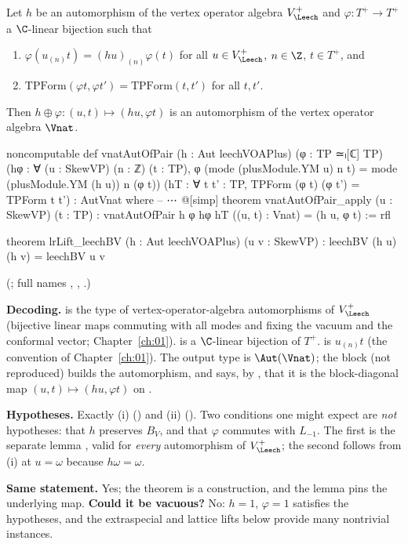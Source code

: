 \begin{theorem}\label{ch22:thm:natural}
Let $h$ be an automorphism of the vertex operator algebra $V_\Leech^+$ and $\varphi:T^+\to T^+$ a $\C$-linear
bijection such that
\begin{enumerate}[label=(\roman*)]
\item $\varphi(u_{(n)}t)=(hu)_{(n)}\varphi(t)$ for all $u\in V_\Leech^+$, $n\in\Z$, $t\in T^+$, and
\item $\mathrm{TPForm}(\varphi t,\varphi t')=\mathrm{TPForm}(t,t')$ for all $t,t'$.
\end{enumerate}
Then $h\oplus\varphi:(u,t)\mapsto(hu,\varphi t)$ is an automorphism of the vertex operator algebra $\Vnat$.
\end{theorem}
\begin{leancode}
noncomputable def vnatAutOfPair (h : Aut leechVOAPlus) (φ : TP ≃ₗ[ℂ] TP)
    (hφ : ∀ (u : SkewVP) (n : ℤ) (t : TP),
      φ (mode (plusModule.YM u) n t) = mode (plusModule.YM (h u)) n (φ t))
    (hT : ∀ t t' : TP, TPForm (φ t) (φ t') = TPForm t t') : AutVnat where
-- ⋯
@[simp] theorem vnatAutOfPair_apply (u : SkewVP) (t : TP) :
    vnatAutOfPair h φ hφ hT ((u, t) : Vnat) = (h u, φ t) := rfl
\end{leancode}
\begin{leancode}
theorem lrLift_leechBV (h : Aut leechVOAPlus) (u v : SkewVP) :
    leechBV (h u) (h v) = leechBV u v
\end{leancode}
(; full names ,
, .)
\begin{dictionary}
\textbf{Decoding.}   is the type of vertex-operator-algebra automorphisms of $V_\Leech^+$
(bijective linear maps commuting with all modes and fixing the vacuum and the conformal vector; Chapter~\ref{ch:01}).
 is a $\C$-linear bijection of $T^+$.   is $u_{(n)}t$ (the
convention  of Chapter~\ref{ch:01}).  The output type  is $\Aut(\Vnat)$; the
 block (not reproduced) builds the automorphism, and  says, by ,
that it is the block-diagonal map $(u,t)\mapsto(hu,\varphi t)$ on .

\textbf{Hypotheses.}  Exactly (i) () and (ii) ().  Two conditions one might expect are \emph{not}
hypotheses: that $h$ preserves $B_V$, and that $\varphi$ commutes with $L_{-1}$.  The first is the separate lemma
, valid for \emph{every} automorphism of $V_\Leech^+$; the second follows from (i) at
$u=\omega$ because $h\omega=\omega$.

\textbf{Same statement.}  Yes; the theorem is a construction, and the  lemma pins the underlying map.
\textbf{Could it be vacuous?}  No: $h=1$, $\varphi=1$ satisfies the hypotheses, and the extraspecial and lattice lifts
below provide many nontrivial instances.
\end{dictionary}
